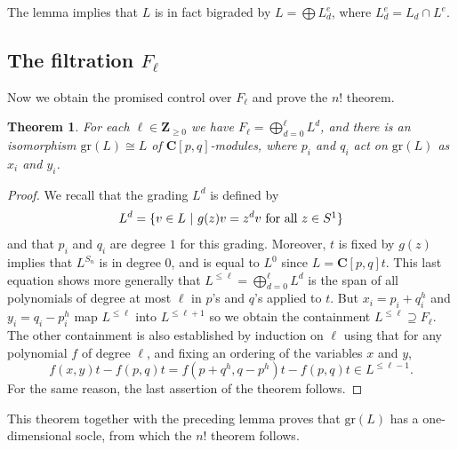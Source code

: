 \documentclass[12pt, reqno]{amsart}
\numberwithin{equation}{section}
\theoremstyle{definition}
\theoremstyle{plain}
\newtheorem{theorem}{Theorem}[section]
\newcommand{\CC}{\mathbf{C}}
\newcommand{\ZZ}{\mathbf{Z}}
\begin{document}
The lemma implies that $L$ is in fact bigraded by $L=\bigoplus L_d^e$, where $L_d^e=L_d \cap L^e$. 
\subsection{The filtration $F_\ell$} 

Now we obtain the promised control over $F_\ell$ and prove the $n!$ theorem. 
\begin{theorem}
For each $\ell \in \ZZ_{\geq 0}$ we have $F_\ell=\bigoplus_{d=0}^\ell L^d$, and there is an isomorphism $\mathrm{gr}(L) \cong L$ of $\CC[p,q]$-modules, where $p_i$ and $q_i$ act on $\mathrm{gr}(L)$ as $x_i$ and $y_i$.
\end{theorem} 
\begin{proof}
We recall that the grading $L^d$ is defined by $$L^d=\{v \in L \ | \ g(z)v=z^d v \ \hbox{for all $z \in S^1$}\}$$ and that $p_i$ and $q_i$ are degree $1$ for this grading. Moreover, $t$ is fixed by $g(z)$ implies that $L^{S_n}$ is in degree $0$, and is equal to $L^0$ since $L=\CC[p,q] t$. This last equation shows more generally that $L^{\leq \ell}=\bigoplus_{d=0}^\ell L^d$ is the span of all polynomials of degree at most $\ell$ in $p$'s and $q$'s applied to $t$. But $x_i=p_i+q_i^h$ and $y_i=q_i-p_i^h$ map $L^{\leq \ell}$ into $L^{\leq \ell+1}$ so we obtain the containment $L^{\leq \ell} \supseteq F_\ell$. The other containment is also established by induction on $\ell$ using that for any polynomial $f$ of degree $\ell$, and fixing an ordering of the variables $x$ and $y$, 
$$f(x,y)t -f(p,q)t=f(p+q^h,q-p^h)t-f(p,q)t \in L^{\leq \ell-1}.$$ For the same reason, the last assertion of the theorem follows.
\end{proof} This theorem together with the preceding lemma proves that $\mathrm{gr}(L)$ has a one-dimensional socle, from which the $n!$ theorem follows.
\end{document}
